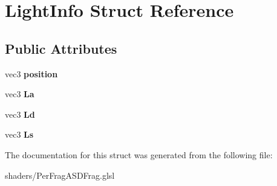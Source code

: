 \hypertarget{structLightInfo}{\section{Light\-Info Struct Reference}
\label{structLightInfo}
}
\subsection*{Public Attributes}
\begin{DoxyCompactItemize}
\item 
\hypertarget{structLightInfo_a4b7fc5ce533fa05ca4411b4fe487764b}{vec3 {\bfseries position}}\label{structLightInfo_a4b7fc5ce533fa05ca4411b4fe487764b}

\item 
\hypertarget{structLightInfo_a55bdac480ba7d575f127d6d37e521a85}{vec3 {\bfseries La}}\label{structLightInfo_a55bdac480ba7d575f127d6d37e521a85}

\item 
\hypertarget{structLightInfo_aba47ea4bbe1f5971651d13d3e37b5d4c}{vec3 {\bfseries Ld}}\label{structLightInfo_aba47ea4bbe1f5971651d13d3e37b5d4c}

\item 
\hypertarget{structLightInfo_a181f97da10dbd47d07eb7faa0b433045}{vec3 {\bfseries Ls}}\label{structLightInfo_a181f97da10dbd47d07eb7faa0b433045}

\end{DoxyCompactItemize}


The documentation for this struct was generated from the following file\-:\begin{DoxyCompactItemize}
\item 
shaders/Per\-Frag\-A\-S\-D\-Frag.\-glsl\end{DoxyCompactItemize}
